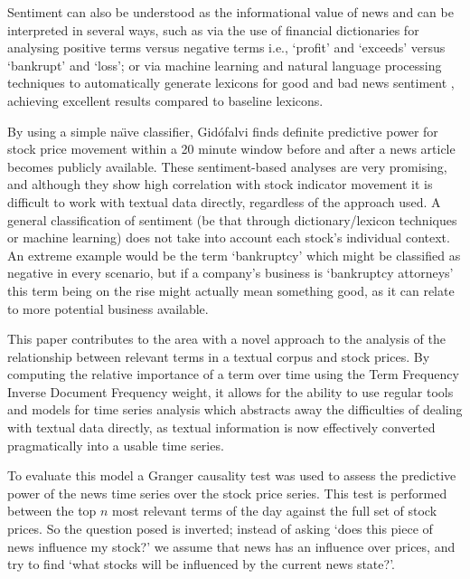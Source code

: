 \documentclass[conference,11pt]{IEEEtran}
\begin{document}
\par
Sentiment can also be understood as the informational value of news and can be interpreted in several ways, such as via the use of financial dictionaries for analysing positive terms versus negative terms 
i.e., `profit' and `exceeds' versus `bankrupt' and `loss'; or via machine learning and natural language processing techniques to automatically generate lexicons for good and bad news sentiment \citep{Oliveira2014}, achieving excellent results compared to baseline lexicons.

\par
By using a simple na\"{\i}ve classifier, Gidófalvi \citep{gidofalvi2001} finds definite predictive power for stock price movement within a 20 minute window before and after a news article becomes publicly available. These sentiment-based analyses are very promising, and although they show high correlation with stock indicator movement it is difficult to work with textual data directly, regardless of the approach used. A general classification of sentiment (be that through dictionary/lexicon techniques or machine learning) does not take into account each stock's individual context. An extreme example would be the term `bankruptcy' which might be classified as negative in every scenario, but if a company's business is `bankruptcy attorneys' this term being on the rise might actually mean something good, as it can relate to more potential business available.

\par
This paper contributes to the area with a novel approach to the analysis of the relationship between relevant terms in a textual corpus and stock prices. By computing the relative importance of a term over time using the Term Frequency Inverse Document Frequency \citep{Ramos2003} weight, it allows for the ability to use regular tools and models for time series analysis which abstracts away the difficulties of dealing with textual data directly, as textual information is now effectively converted pragmatically into a usable time series.

\par
To evaluate this model a Granger causality test \citep{Granger1969,Granger1980} was used to assess the predictive power of the news time series over the stock price series. This test is performed between the top \(n\) most relevant terms of the day against the full set of stock prices. So the question posed is inverted; instead of asking `does this piece of news influence my stock?' we assume that news has an influence over prices, and try to find `what stocks will be influenced by the current news state?'.
\end{document}
